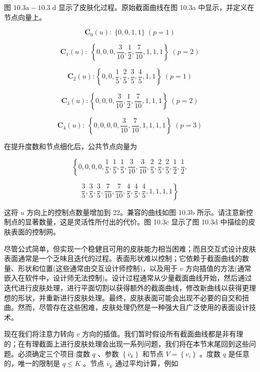 \documentclass[../main.tex]{subfiles}
\begin{document}
图 \({10.3}\mathrm{a} - {10.3}\mathrm{\;d}\) 显示了皮肤化过程。原始截面曲线在图 10.3a 中显示，并定义在节点向量上。

\[
{\mathbf{C}}_{0}\left( u\right)  : \;\{ 0,0,1,1\} \;\left( {p = 1}\right)
\]

\[
{\mathbf{C}}_{1}\left( u\right)  : \;\left\{  {0,0,0,\frac{3}{10},\frac{1}{2},\frac{7}{10},1,1,1}\right\}  \;\left( {p = 2}\right)
\]

\[
{\mathbf{C}}_{2}\left( u\right)  : \left\{  {0,0,\frac{1}{5},\frac{2}{5},\frac{3}{5},\frac{4}{5},1,1}\right\}  \;\left( {p = 1}\right)
\]





\[
{\mathbf{C}}_{3}\left( u\right)  : \left\{  {0,0,0,\frac{3}{10},\frac{1}{2},\frac{7}{10},1,1,1}\right\}  \;\left( {p = 2}\right)
\]

\[
{\mathbf{C}}_{4}\left( u\right)  : \;\left\{  {0,0,0,0,\frac{3}{10},\frac{7}{10},1,1,1,1}\right\}  \;\left( {p = 3}\right)
\]





在提升度数和节点细化后，公共节点向量为

\[
\left\{  {0,0,0,0,\frac{1}{5},\frac{1}{5},\frac{1}{5},\frac{3}{10},\frac{3}{10},\frac{2}{5},\frac{2}{5},\frac{2}{5},\frac{1}{2},\frac{1}{2},}\right.
\]

\[
\left. {\frac{3}{5},\frac{3}{5},\frac{3}{5},\frac{7}{10},\frac{7}{10},\frac{4}{5},\frac{4}{5},\frac{4}{5},1,1,1,1}\right\}
\]

这将 \(u\) 方向上的控制点数量增加到 22。兼容的曲线如图 10.3b 所示。请注意新控制点的显著数量，这是灵活性所付出的代价。图 10.3c 显示了图 10.3d 中描绘的皮肤表面的控制网。

尽管公式简单，但实现一个稳健且可用的皮肤能力相当困难；而且交互式设计皮肤表面通常是一个乏味且迭代的过程。表面形状难以控制；它依赖于截面曲线的数量、形状和位置(这些通常由交互设计师控制)，以及用于 \(v\) 方向插值的方法(通常嵌入在软件中，设计师无法控制)。设计过程通常从少量截面曲线开始，然后通过迭代进行皮肤处理，进行平面切割以获得额外的截面曲线，修改新曲线以获得更理想的形状，并重新进行皮肤处理。最终，皮肤表面可能会出现不必要的自交和扭曲。然而，尽管存在这些困难，皮肤处理仍然是一种强大且广泛使用的表面设计技术。

现在我们将注意力转向 \(v\) 方向的插值。我们暂时假设所有截面曲线都是非有理的；在有理截面上进行皮肤处理会出现一系列问题，我们将在本节末尾回到这些问题。必须确定三个项目:度数 \(q\) 、参数 \(\left\{  {\bar{v}}_{k}\right\}\) 和节点 \(V = \left\{  {v}_{i}\right\}\) 。度数 \(q\) 是任意的，唯一的限制是 \(q \leq  K\) 。节点 \({\bar{v}}_{k}\) 通过平均计算，例如
\end{document}
